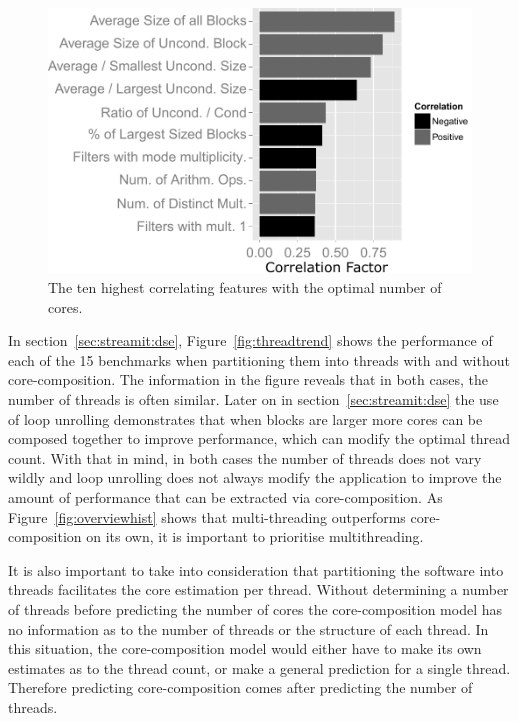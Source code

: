 
\begin{figure}[t]
\centering
  \includegraphics[width=1\textwidth]{streamit-paper/graphics/corrGraph_remix.pdf}
  \caption{The ten highest correlating features with the optimal number of cores.}\label{fig:corrCore}
\end{figure}


In section~\ref{sec:streamit:dse}, Figure~\ref{fig:threadtrend} shows the performance of each of the 15 benchmarks when partitioning them into threads with and without core-composition.
The information in the figure reveals that in both cases, the number of threads is often similar.
Later on in section~\ref{sec:streamit:dse} the use of loop unrolling demonstrates that when blocks are larger more cores can be composed together to improve performance, which can modify the optimal thread count.
With that in mind, in both cases the number of threads does not vary wildly and loop unrolling does not always modify the application to improve the amount of performance that can be extracted via core-composition.
As Figure~\ref{fig:overviewhist} shows that multi-threading outperforms core-composition on its own, it is important to prioritise multithreading.

It is also important to take into consideration that partitioning the software into threads facilitates the core estimation per thread.
Without determining a number of threads before predicting the number of cores the core-composition model has no information as to the number of threads or the structure of each thread.
In this situation, the core-composition model would either have to make its own estimates as to the thread count, or make a general prediction for a single thread.
Therefore predicting core-composition comes after predicting the number of threads.

